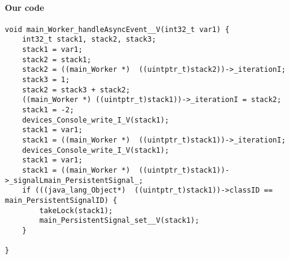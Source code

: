 \paragraph{Our code}\hfill
\begin{lstlisting}[firstnumber=2230]
void main_Worker_handleAsyncEvent__V(int32_t var1) {
	int32_t stack1, stack2, stack3;
	stack1 = var1;
	stack2 = stack1;
	stack2 = ((main_Worker *)  ((uintptr_t)stack2))->_iterationI;
	stack3 = 1;
	stack2 = stack3 + stack2;
	((main_Worker *) ((uintptr_t)stack1))->_iterationI = stack2;
	stack1 = -2;
	devices_Console_write_I_V(stack1);
	stack1 = var1;
	stack1 = ((main_Worker *)  ((uintptr_t)stack1))->_iterationI;
	devices_Console_write_I_V(stack1);
	stack1 = var1;
	stack1 = ((main_Worker *)  ((uintptr_t)stack1))->_signalLmain_PersistentSignal_;
	if (((java_lang_Object*)  ((uintptr_t)stack1))->classID == main_PersistentSignalID) {
		takeLock(stack1);
		main_PersistentSignal_set__V(stack1);
	}

}
\end{lstlisting}

